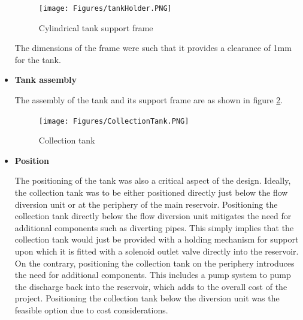 \begin{itemize}
\begin{figure}[H]
    \centering
    \texttt{[image: Figures/tankHolder.PNG]}
    \caption{Cylindrical tank support frame}
    \label{fig:cylindrical_tank_support_frame}
\end{figure}

The dimensions of the frame were such that it provides a clearance of 1mm for the tank.

\par
\item \textbf{Tank assembly}
\par
The assembly of the tank and its support frame are as shown in figure \ref{fig:collection_tank}.
\begin{figure}[H]
    \centering
    \texttt{[image: Figures/CollectionTank.PNG]}
    \caption{Collection tank}
    \label{fig:collection_tank}
\end{figure}
\par
\item \textbf{Position}
\par
The positioning of the tank was also a critical aspect of the design. Ideally, the collection tank was to be either positioned directly just below the flow diversion unit or at the periphery of the main reservoir. Positioning the collection tank directly below the flow diversion unit mitigates the need for additional components such as diverting pipes. This simply implies that the collection tank would just be provided with a holding mechanism for support upon which it is fitted with a solenoid outlet valve directly into the reservoir. On the contrary, positioning the collection tank on the periphery introduces the need for additional components. This includes a pump system to pump the discharge back into the reservoir, which adds to the overall cost of the project. Positioning the collection tank below the diversion unit was the feasible option due to cost considerations.
\end{itemize}

